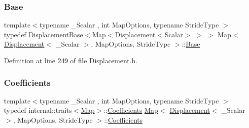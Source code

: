 \subsubsection{\texorpdfstring{Base}{Base}}
{\footnotesize\ttfamily template$<$typename \+\_\+\+Scalar , int Map\+Options, typename Stride\+Type $>$ \\
typedef \hyperlink{class_displacement_base}{Displacement\+Base}$<$\hyperlink{class_map_3_01_displacement_3_01___scalar_01_4_00_01_map_options_00_01_stride_type_01_4_a7355e77dc9b91bd8cb68f20847318f0f}{Map}$<$\hyperlink{class_displacement}{Displacement}$<$\hyperlink{class_map_3_01_displacement_3_01___scalar_01_4_00_01_map_options_00_01_stride_type_01_4_a1558058db0e90cb7253d6b2dbf414099}{Scalar}$>$ $>$ $>$ \hyperlink{class_map_3_01_displacement_3_01___scalar_01_4_00_01_map_options_00_01_stride_type_01_4_a7355e77dc9b91bd8cb68f20847318f0f}{Map}$<$ \hyperlink{class_displacement}{Displacement}$<$ \+\_\+\+Scalar $>$, Map\+Options, Stride\+Type $>$\+::\hyperlink{class_map_3_01_displacement_3_01___scalar_01_4_00_01_map_options_00_01_stride_type_01_4_a1df1fc84e68f902341a4d48037cf82dd}{Base}\hspace{0.3cm}{\ttfamily [protected]}}



Definition at line 249 of file Displacement.\+h.

\hypertarget{class_map_3_01_displacement_3_01___scalar_01_4_00_01_map_options_00_01_stride_type_01_4_a3213feadb99e77889a832a1ef1e80b4b}{}\label{class_map_3_01_displacement_3_01___scalar_01_4_00_01_map_options_00_01_stride_type_01_4_a3213feadb99e77889a832a1ef1e80b4b} 
\subsubsection{\texorpdfstring{Coefficients}{Coefficients}}
{\footnotesize\ttfamily template$<$typename \+\_\+\+Scalar , int Map\+Options, typename Stride\+Type $>$ \\
typedef internal\+::traits$<$\hyperlink{class_map_3_01_displacement_3_01___scalar_01_4_00_01_map_options_00_01_stride_type_01_4_a7355e77dc9b91bd8cb68f20847318f0f}{Map}$>$\+::\hyperlink{class_map_3_01_displacement_3_01___scalar_01_4_00_01_map_options_00_01_stride_type_01_4_a3213feadb99e77889a832a1ef1e80b4b}{Coefficients} \hyperlink{class_map_3_01_displacement_3_01___scalar_01_4_00_01_map_options_00_01_stride_type_01_4_a7355e77dc9b91bd8cb68f20847318f0f}{Map}$<$ \hyperlink{class_displacement}{Displacement}$<$ \+\_\+\+Scalar $>$, Map\+Options, Stride\+Type $>$\+::\hyperlink{class_map_3_01_displacement_3_01___scalar_01_4_00_01_map_options_00_01_stride_type_01_4_a3213feadb99e77889a832a1ef1e80b4b}{Coefficients}}




